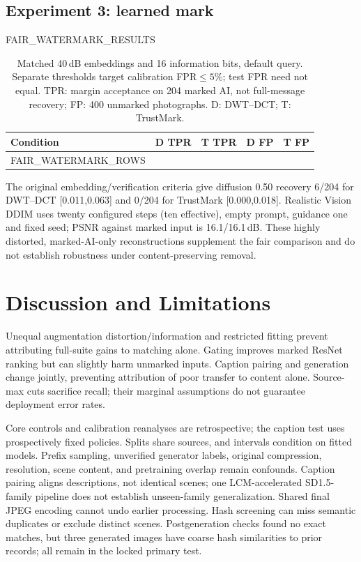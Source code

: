 \documentclass[conference]{IEEEtran}
\begin{document}
\subsection{Experiment 3: learned mark}
{{FAIR_WATERMARK_RESULTS}}
\begin{table}[t]
\caption{Matched 40\,dB embeddings and 16 information bits, default query.
Separate thresholds target calibration FPR$\le5\%$; test FPR need not equal.
TPR: margin acceptance on 204 marked AI, not full-message recovery;
FP: 400 unmarked photographs. D: DWT--DCT; T: TrustMark.}
\label{tab:modern}\centering\footnotesize\setlength{\tabcolsep}{3pt}
\begin{tabular}{lrrrr}\toprule
Condition & D TPR & T TPR & D FP & T FP\\\midrule
{{FAIR_WATERMARK_ROWS}}
\bottomrule\end{tabular}\end{table}
The original embedding/verification criteria give diffusion 0.50 recovery
6/204 for DWT--DCT [0.011,0.063] and 0/204 for TrustMark [0.000,0.018].
Realistic Vision DDIM uses twenty configured steps (ten effective), empty
prompt, guidance one and fixed seed; PSNR against marked input is 16.1/16.1\,dB.
These highly distorted, marked-AI-only reconstructions supplement the fair
comparison and do not establish robustness under content-preserving removal.

\section{Discussion and Limitations}
Unequal augmentation distortion/information and restricted fitting prevent
attributing full-suite gains to matching alone. Gating improves marked ResNet
ranking but can slightly harm unmarked inputs. Caption pairing and generation
change jointly, preventing attribution of poor transfer to content alone.
Source-max cuts sacrifice recall; their marginal assumptions do not guarantee
deployment error rates.

Core controls and calibration reanalyses are retrospective; the caption test
uses prospectively fixed policies. Splits share sources, and intervals
condition on fitted models. Prefix sampling, unverified generator labels,
original compression, resolution, scene content, and pretraining overlap
remain confounds. Caption pairing aligns descriptions, not identical scenes;
one LCM-accelerated SD1.5-family pipeline does not establish unseen-family
generalization. Shared final JPEG encoding cannot undo earlier processing.
Hash screening can miss semantic duplicates or exclude distinct scenes.
Postgeneration checks found no exact matches, but three generated images have
coarse hash similarities to prior records; all remain in the locked primary test.
\end{document}
